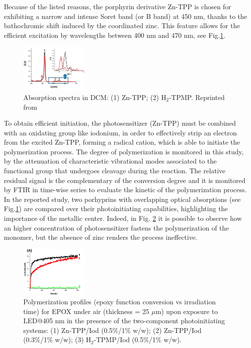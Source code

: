 \documentclass[twoside,twocolumn,9pt]{article}
\begin{document}
Because of the listed reasons, the porphyrin derivative Zn-TPP is chosen for exhibiting a narrow and intense Soret band (or B band) at 450 nm, thanks to the bathochromic shift induced by the coordinated zinc.
This feature allows for the efficient excitation by wavelengths between 400 nm and 470 nm, see Fig.\ref{UV-Vis-Zn-TPP}.
\begin{figure}
	\centering
	\includegraphics[width=0.3\textwidth]{UV-Vis-Zn-TPP}
	\caption{Absorption spectra in DCM: (1) Zn-TPP; (2) H$_{2}$-TPMP. Reprinted from \citet{al_mousawi_zinc_2017}}
	\label{UV-Vis-Zn-TPP}
\end{figure}
To obtain efficient initiation, the photosensitizer (Zn-TPP) must be combined with an oxidating group like iodonium, in order to effectively strip an electron from the excited Zn-TPP, forming a radical cation, which is able to initiate the polymerization process.
The degree of polymerization is monitored in this study, by the attenuation of characteristic vibrational modes associated to the functional group that undergoes cleavage during the reaction.
The relative residual signal is the complementary of the conversion degree and it is monitored by FTIR in time-wise series to evaluate the kinetic of the polymerization process.
In the reported study, two porhyprins with overlapping optical absorptions (see Fig.\ref{UV-Vis-Zn-TPP}) are compared over their photoinitiating capabilities, highlighting the importance of the metallic center.
Indeed, in Fig. \ref{conv-ZnTPP} it is possible to observe how an higher concentration of photosensitizer fastens the polymerization of the monomer, but the absence of zinc renders the process ineffective.
\begin{figure}
	\centering
	\includegraphics[width=0.3\textwidth]{conv-Zn-TPP}
	\caption{Polymerization profiles (epoxy function conversion vs irradiation time) for EPOX under air (thickness = 25 $\mu$m) upon exposure to
		LED@405 nm in the presence of the two-component photoinitiating systems: (1) Zn-TPP/Iod (0.5\%/1\% w/w); (2) Zn-TPP/Iod (0.3\%/1\% w/w);
		(3) H$_{2}$-TPMP/Iod (0.5\%/1\% w/w).}
	\label{conv-ZnTPP}
\end{figure}
\end{document}
